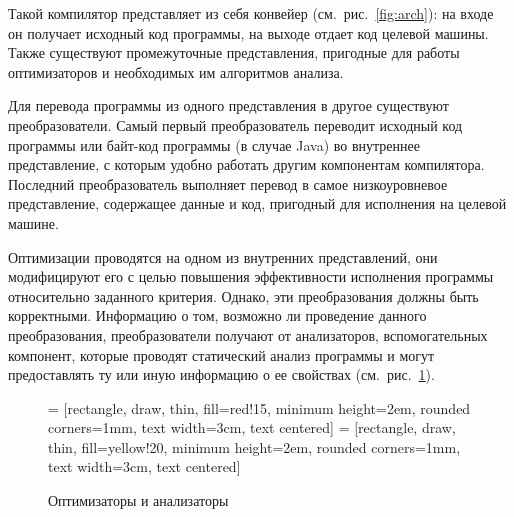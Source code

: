 \documentclass[14pt,titlepage]{extarticle}
\newcommand{\eng}[1]{{\English#1}}
\newcommand{\java}{\eng{Java}\xspace}
\begin{document}
      Такой компилятор представляет из себя конвейер (см.~рис.~\ref{fig:arch}):
      на входе он получает исходный код программы, на выходе отдает код целевой
      машины.
      Также существуют промежуточные представления, пригодные для работы
      оптимизаторов и необходимых им алгоритмов анализа.

      Для перевода программы из одного представления в другое существуют
      преобразователи.
      Самый первый преобразователь переводит исходный код программы
      или байт-код программы (в случае \java)
      во внутреннее представление, с которым удобно работать другим
      компонентам компилятора.
      Последний преобразователь выполняет перевод в самое низкоуровневое
      представление, содержащее данные и код, пригодный для исполнения
      на целевой машине.

      Оптимизации проводятся на одном из внутренних представлений, они
      модифицируют его с целью повышения эффективности исполнения программы
      относительно заданного критерия. Однако, эти преобразования должны быть
      корректными. Информацию о том, возможно ли проведение данного
      преобразования, преобразователи получают от анализаторов, вспомогательных
      компонент, которые проводят статический анализ программы и могут
      предоставлять ту или иную информацию о ее свойствах
      (см.~рис.~\ref{fig:optimizators}).

      \begin{figure}[!htb]
        \centering

         = [rectangle, draw, thin, fill=red!15,
                            minimum height=2em, rounded corners=1mm,
                            text width=3cm, text centered]
         =  [rectangle, draw, thin, fill=yellow!20,
                            minimum height=2em, rounded corners=1mm,
                            text width=3cm, text centered]

        \caption{Оптимизаторы и анализаторы}
        \label{fig:optimizators}
      \end{figure}
\end{document}
